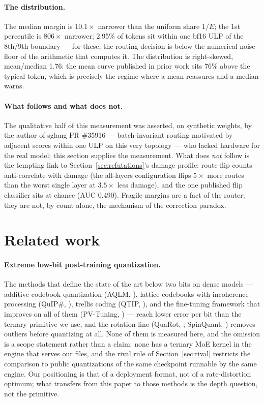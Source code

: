 \documentclass[10pt]{article} %
\begin{document}
\paragraph{The distribution.} The median margin is $10.1\times$ narrower than the uniform
share $1/E$; the 1st percentile is $806\times$ narrower; 2.95\% of tokens sit within
one bf16 ULP of the 8th/9th boundary --- for these, the routing decision is
below the numerical noise floor of the arithmetic that computes it. The
distribution is right-skewed, mean/median 1.76: the mean curve published in
prior work sits 76\% above the typical token, which is precisely the
regime where a mean reassures and a median warns.

\paragraph{What follows and what does not.} The qualitative half of this measurement
was asserted, on synthetic weights, by the author of sglang PR \#35916
\citep{sglang35916} --- batch-invariant routing motivated by adjacent scores within one ULP on this
very topology --- who lacked hardware for the real model; this section
supplies the measurement. What does \emph{not} follow is the tempting link to
Section~\ref{sec:refutations}'s damage profile: route-flip counts anti-correlate with damage
(the all-layers configuration flips $5\times$ more routes than the worst single
layer at $3.5\times$ less damage), and the one published flip classifier sits at
chance (AUC 0.490). Fragile margins are a fact of the router; they are not,
by count alone, the mechanism of the correction paradox.

\section{Related work}
\label{sec:related}

\paragraph{Extreme low-bit post-training quantization.} The methods that
define the state of the art below two bits on dense models --- additive
codebook quantization (AQLM, \citealp{egiazarian2024aqlm}), lattice codebooks
with incoherence processing (QuIP\#, \citealp{tseng2024quipsharp}), trellis
coding (QTIP, \citealp{tseng2024qtip}), and the fine-tuning framework that
improves on all of them (PV-Tuning, \citealp{malinovskii2024pvtuning}) ---
reach lower error per bit than the ternary primitive we use, and the rotation
line (QuaRot, \citealp{ashkboos2024quarot}; SpinQuant,
\citealp{liu2025spinquant}) removes outliers before quantizing at all. None of
them is measured here, and the omission is a scope statement rather than a
claim: none has a ternary MoE kernel in the engine that serves our files, and
the rival rule of Section~\ref{sec:rival} restricts the comparison to public
quantizations of the same checkpoint runnable by the same engine. Our
positioning is that of a deployment format, not of a rate-distortion optimum;
what transfers from this paper to those methods is the depth question, not the
primitive.
\end{document}
